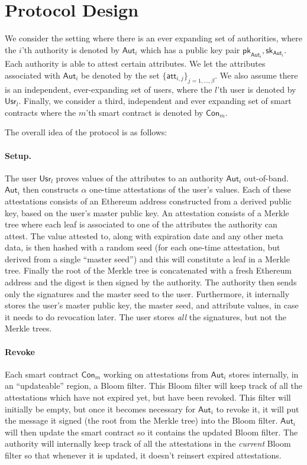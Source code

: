 \documentclass[11pt]{article} %
\newcommand{\aut}{\ensuremath{\mathsf{Aut}_i}}
\newcommand{\usr}{\ensuremath{\mathsf{Usr}_l}}
\newcommand{\con}{\ensuremath{\mathsf{Con}_m}}
\newcommand{\pk}{\ensuremath{\mathsf{pk}}}
\newcommand{\sk}{\ensuremath{\mathsf{sk}}}
\begin{document}
\section{Protocol Design}
We consider the setting where there is an ever expanding set of authorities, where the $i$'th authority is denoted by $\mathsf{Aut}_i$ which has a public key pair $\pk_{\aut}, \sk_{\aut}$. Each authority is able to attest certain attributes. We let the attributes associated with $\mathsf{Aut}_i$ be denoted by the set $\{\mathsf{att}_{i,j}\}_{j=1, \dots, \beta}$. We also assume there is an independent, ever-expanding set of users, where the $l$'th user is denoted by $\mathsf{Usr}_l$. Finally, we consider a third, independent and ever expanding set of smart contracts where the $m$'th smart contract is denoted by $\mathsf{Con}_m$.

The overall idea of the protocol is as follows:
\paragraph{Setup.} The user $\usr$ proves values of the attributes to an authority $\aut$ out-of-band. $\aut$ then constructs $\alpha$ one-time attestations of the user's values. Each of these attestations consists of an Ethereum address constructed from a derived public key, based on the user's master public key. An attestation consists of a Merkle tree where each leaf is associated to one of the attributes the authority can attest. The value attested to, along with expiration date and any other meta data, is then hashed with a random seed (for each one-time attestation, but derived from a single ``master seed'') and this will constitute a leaf in a Merkle tree. Finally the root of the Merkle tree is concatenated with a fresh Ethereum address and the digest is then signed by the authority. The authority then sends only the signatures and the master seed to the user. Furthermore, it internally stores the user's master public key, the master seed, and attribute values, in case it needs to do revocation later. The user stores \emph{all} the signatures, but not the Merkle trees.

\paragraph{Revoke}
Each smart contract $\con$ working on attestations from $\aut$ stores internally, in an ``updateable'' region, a Bloom filter. This Bloom filter will keep track of all the attestations which have not expired yet, but have been revoked. This filter will initially be empty, but once it becomes necessary for $\aut$ to revoke it, it will put the message it signed (the root from the Merkle tree) into the Bloom filter. $\aut$ will then update the smart contract so it contains the updated Bloom filter. The authority will internally keep track of all the attestations in the \emph{current} Bloom filter so that whenever it is updated, it doesn't reinsert expired attestations.
\end{document}
